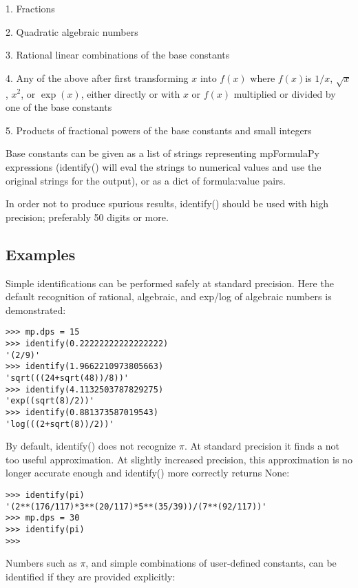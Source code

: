 1. Fractions

2. Quadratic algebraic numbers

3. Rational linear combinations of the base constants

4. Any of the above after first transforming $x$ into $f(x)$ where $f(x)$is $1/x$, $\sqrt{x}$, $x^2$, or $\exp(x)$, either directly or with $x$ or $f(x)$ multiplied or divided by one of the base constants 

5. Products of fractional powers of the base constants and small integers

\vpara
Base constants can be given as a list of strings representing mpFormulaPy expressions (identify() will eval the strings to numerical values and use the original strings for the output), or as a dict of formula:value pairs.

\vpara
In order not to produce spurious results, identify() should be used with high precision; preferably 50 digits or more.



\subsection{Examples}

Simple identifications can be performed safely at standard precision. Here the default recognition of rational, algebraic, and exp/log of algebraic numbers is demonstrated:


\begin{lstlisting}
>>> mp.dps = 15
>>> identify(0.22222222222222222)
'(2/9)'
>>> identify(1.9662210973805663)
'sqrt(((24+sqrt(48))/8))'
>>> identify(4.1132503787829275)
'exp((sqrt(8)/2))'
>>> identify(0.881373587019543)
'log(((2+sqrt(8))/2))'
\end{lstlisting}


By default, identify() does not recognize $\pi$. At standard precision it finds a not too useful approximation. At slightly increased precision, this approximation is no longer accurate enough and identify() more correctly returns None:

\begin{lstlisting}
>>> identify(pi)
'(2**(176/117)*3**(20/117)*5**(35/39))/(7**(92/117))'
>>> mp.dps = 30
>>> identify(pi)
>>>
\end{lstlisting}


Numbers such as $\pi$, and simple combinations of user-defined constants, can be identified if they are provided explicitly:

